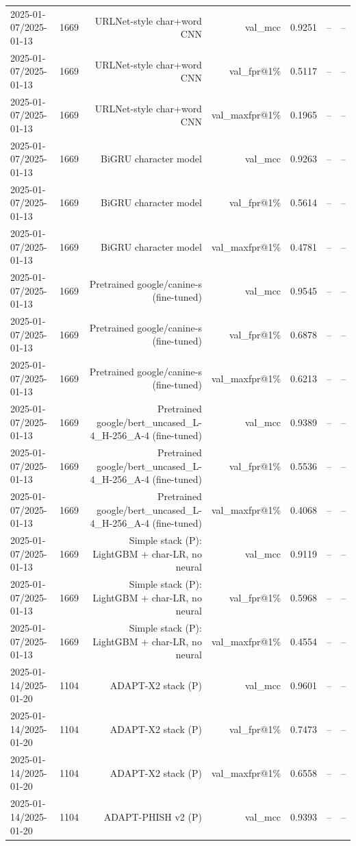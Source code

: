 \begin{table}[t]
\begin{tabular}{llrrrrr}
2025-01-07/2025-01-13 & 1669 & URLNet-style char+word CNN & val\_mcc & 0.9251 & -- & -- \\
2025-01-07/2025-01-13 & 1669 & URLNet-style char+word CNN & val\_fpr@1\% & 0.5117 & -- & -- \\
2025-01-07/2025-01-13 & 1669 & URLNet-style char+word CNN & val\_maxfpr@1\% & 0.1965 & -- & -- \\
2025-01-07/2025-01-13 & 1669 & BiGRU character model & val\_mcc & 0.9263 & -- & -- \\
2025-01-07/2025-01-13 & 1669 & BiGRU character model & val\_fpr@1\% & 0.5614 & -- & -- \\
2025-01-07/2025-01-13 & 1669 & BiGRU character model & val\_maxfpr@1\% & 0.4781 & -- & -- \\
2025-01-07/2025-01-13 & 1669 & Pretrained google/canine-s (fine-tuned) & val\_mcc & 0.9545 & -- & -- \\
2025-01-07/2025-01-13 & 1669 & Pretrained google/canine-s (fine-tuned) & val\_fpr@1\% & 0.6878 & -- & -- \\
2025-01-07/2025-01-13 & 1669 & Pretrained google/canine-s (fine-tuned) & val\_maxfpr@1\% & 0.6213 & -- & -- \\
2025-01-07/2025-01-13 & 1669 & Pretrained google/bert\_uncased\_L-4\_H-256\_A-4 (fine-tuned) & val\_mcc & 0.9389 & -- & -- \\
2025-01-07/2025-01-13 & 1669 & Pretrained google/bert\_uncased\_L-4\_H-256\_A-4 (fine-tuned) & val\_fpr@1\% & 0.5536 & -- & -- \\
2025-01-07/2025-01-13 & 1669 & Pretrained google/bert\_uncased\_L-4\_H-256\_A-4 (fine-tuned) & val\_maxfpr@1\% & 0.4068 & -- & -- \\
2025-01-07/2025-01-13 & 1669 & Simple stack (P): LightGBM + char-LR, no neural & val\_mcc & 0.9119 & -- & -- \\
2025-01-07/2025-01-13 & 1669 & Simple stack (P): LightGBM + char-LR, no neural & val\_fpr@1\% & 0.5968 & -- & -- \\
2025-01-07/2025-01-13 & 1669 & Simple stack (P): LightGBM + char-LR, no neural & val\_maxfpr@1\% & 0.4554 & -- & -- \\
2025-01-14/2025-01-20 & 1104 & ADAPT-X2 stack (P) & val\_mcc & 0.9601 & -- & -- \\
2025-01-14/2025-01-20 & 1104 & ADAPT-X2 stack (P) & val\_fpr@1\% & 0.7473 & -- & -- \\
2025-01-14/2025-01-20 & 1104 & ADAPT-X2 stack (P) & val\_maxfpr@1\% & 0.6558 & -- & -- \\
2025-01-14/2025-01-20 & 1104 & ADAPT-PHISH v2 (P) & val\_mcc & 0.9393 & -- & -- \\

\end{tabular}
\end{table}
